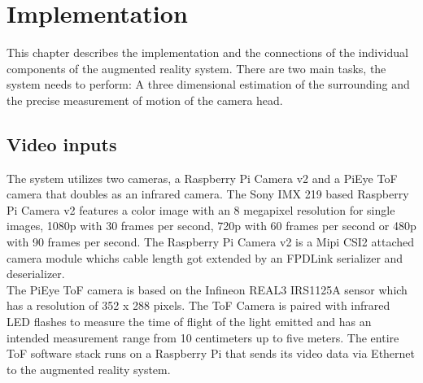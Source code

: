 \chapter{Implementation}
\label{sec:Implementation}
This chapter describes the implementation and the connections of the individual components of the augmented reality system. There are two main tasks, the system needs to perform: A three dimensional estimation of the surrounding and the precise measurement of motion of the camera head.
\section{Video inputs}
The system utilizes two cameras, a Raspberry Pi Camera v2 and a PiEye ToF camera that doubles as an infrared camera. The Sony IMX 219 based Raspberry Pi Camera v2 features a color image with an 8 megapixel resolution for single images, 1080p with 30 frames per second, 720p with 60 frames per second or 480p with 90 frames per second.\cite{raspiCamSpec} The Raspberry Pi Camera v2 is a Mipi CSI2 attached camera module whichs cable length got extended by an FPDLink serializer and deserializer.\\
The PiEye ToF camera is based on the Infineon REAL3 IRS1125A sensor which has a resolution of 352 x 288 pixels\cite{piEyeShop}. The ToF Camera is paired with infrared LED flashes to measure the time of flight of the light emitted and has an intended measurement range from 10 centimeters up to five meters. The entire ToF software stack runs on a Raspberry Pi that sends its video data via Ethernet to the augmented reality system.\\


